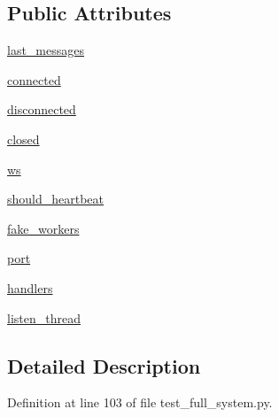 \subsection*{Public Attributes}
\begin{DoxyCompactItemize}
\item 
\hyperlink{classparlai_1_1mturk_1_1core_1_1test_1_1test__full__system_1_1MockSocket_abd62d703006a741f11922e621fd033be}{last\+\_\+messages}
\item 
\hyperlink{classparlai_1_1mturk_1_1core_1_1test_1_1test__full__system_1_1MockSocket_a1c69f2c0e85a567360d38ce105ae47a4}{connected}
\item 
\hyperlink{classparlai_1_1mturk_1_1core_1_1test_1_1test__full__system_1_1MockSocket_a25815cbde935f14c08c707295ef2eb48}{disconnected}
\item 
\hyperlink{classparlai_1_1mturk_1_1core_1_1test_1_1test__full__system_1_1MockSocket_abc6460e0ba4ef0c849408f4403206a1d}{closed}
\item 
\hyperlink{classparlai_1_1mturk_1_1core_1_1test_1_1test__full__system_1_1MockSocket_a954ed7f85a85a36db6ce598d5e633aea}{ws}
\item 
\hyperlink{classparlai_1_1mturk_1_1core_1_1test_1_1test__full__system_1_1MockSocket_ad4ae87c752baa26a3f038ef538be1160}{should\+\_\+heartbeat}
\item 
\hyperlink{classparlai_1_1mturk_1_1core_1_1test_1_1test__full__system_1_1MockSocket_a7dd45e7577339ded43b4056cfc33bf59}{fake\+\_\+workers}
\item 
\hyperlink{classparlai_1_1mturk_1_1core_1_1test_1_1test__full__system_1_1MockSocket_a33c2ad664fadff34fcba9ede312be2cd}{port}
\item 
\hyperlink{classparlai_1_1mturk_1_1core_1_1test_1_1test__full__system_1_1MockSocket_a8226251517330cc176d7155983a26d3a}{handlers}
\item 
\hyperlink{classparlai_1_1mturk_1_1core_1_1test_1_1test__full__system_1_1MockSocket_a21da0874111057953c5fc18d802aa57e}{listen\+\_\+thread}
\end{DoxyCompactItemize}


\subsection{Detailed Description}


Definition at line 103 of file test\+\_\+full\+\_\+system.\+py.



